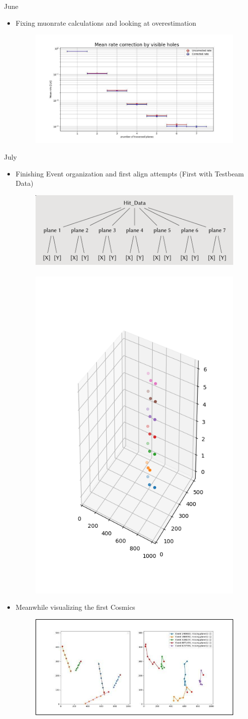\documentclass{beamer}
\begin{document}
\begin{frame}{June}
    \begin{itemize}
	\item Fixing muonrate calculations and looking at overestimation
	    \begin{figure}[H]
		\centering
		\includegraphics[width=.9\textwidth]{DavidCorrection.jpg}
	    \end{figure}
    \end{itemize}
\end{frame}

\begin{frame}{July}
    \begin{itemize}
	\item Finishing Event organization and first align attempts
	    (First with Testbeam Data)
	    \begin{figure}[H]
		\centering
		\includegraphics[width=.4\textwidth]{MauriceEventOrg.png}
		\
		\includegraphics[width=.15\textwidth]{MauriceFirstAlign.png}
	    \end{figure}
	\item Meanwhile visualizing the first Cosmics
	    \begin{figure}[H]
		\centering
		\includegraphics[width=.4\textwidth]{DavidFirstVisual.jpg}
	    \end{figure}
    \end{itemize}
\end{frame}
\end{document}
